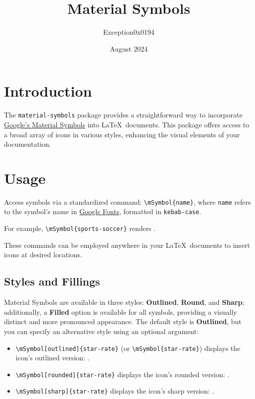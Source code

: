 \documentclass[11pt]{article}
\title{Material Symbols}
\date{August 2024}
\author{Exception0x0194}
\begin{document}
\maketitle

\section{Introduction}

The \texttt{material-symbols} package provides a straightforward way to incorporate \href{https://fonts.google.com/icons}{Google's Material Symbols} into \LaTeX\ documents. This package offers access to a broad array of icons in various styles, enhancing the visual elements of your documentation.

\section{Usage}

Access symbols via a standardized command: \texttt{\textbackslash mSymbol\{name\}}, where \texttt{name} refers to the symbol's name in \href{https://fonts.google.com/icons}{Google Fonts}, formatted in \texttt{kebab-case}.

For example, \texttt{\textbackslash mSymbol\{sports-soccer\}} renders .

These commands can be employed anywhere in your \LaTeX\ documents to insert icons at desired locations.

\subsection{Styles and Fillings}

Material Symbols are available in three styles: \textbf{Outlined}, \textbf{Round}, and \textbf{Sharp}; additionally, a \textbf{Filled} option is available for all symbols, providing a visually distinct and more pronounced appearance. The default style is \textbf{Outlined}, but you can specify an alternative style using an optional argument:

\begin{itemize}
    \item \texttt{\textbackslash mSymbol[outlined]\{star-rate\}} (or \texttt{\textbackslash mSymbol\{star-rate\}}) displays the icon's outlined version: .
    \item \texttt{\textbackslash mSymbol[rounded]\{star-rate\}} displays the icon's rounded version: .
    \item \texttt{\textbackslash mSymbol[sharp]\{star-rate\}} displays the icon's sharp version: .
\end{itemize}
\end{document}
